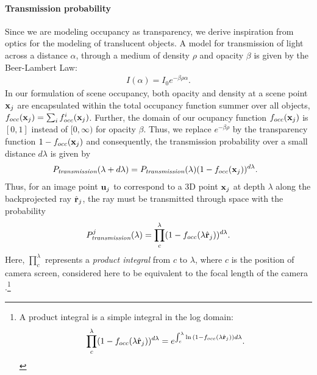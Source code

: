 \paragraph{Transmission probability}
\label{sec:ptransmission}
Since we are modeling occupancy as transparency, we derive inspiration from optics for the modeling of translucent objects. A model for transmission of light across a distance $\alpha$, through a medium of density $\rho$ and opacity $\beta$ is given by the Beer-Lambert Law:
\begin{align}
I(\alpha) = I_0 e^{-\beta\rho\alpha}.
\end{align}
%
In our formulation of scene occupancy, both opacity and density at a scene point $\mathbf{x}_j$ are encapsulated within the total occupancy function summer over all objects, $f_{occ}(\mathbf{x}_j) = \sum_i f^i_{occ}(\mathbf{x}_j)$. Further, the domain of our ocupancy function $f_{occ}(\mathbf{x}_j)$ is $[0, 1]$ instead of $[0, \infty)$ for opacity $\beta$. Thus, we replace $e^{-\beta\rho}$ by the transparency function $1 - f_{occ}(\mathbf{x}_j)$ and consequently, the transmission probability over a small distance $d\lambda$ is given by
%
\begin{align}
  \!\!\!\! P_{\textit{transmission}}(\lambda + d\lambda) = P_{\textit{transmission}}(\lambda) (1-f_{occ}(\mathbf{x}_j))^{d\lambda}.
\end{align}
%
Thus, for an image point $\mathbf{u}_j$ to correspond to a 3D point $\mathbf{x}_j$ at depth $\lambda$ along the backprojected ray $\hat{\mathbf{r}}_j$, the ray must be transmitted through space with the probability
\begin{align}
P^j_{\textit{transmission}}(\lambda) = \prod_{c}^{\lambda} (1 - f_{occ}(\lambda \hat{\mathbf{r}}_j))^{d\lambda}.
\label{eq:ptrans-integral}
\end{align}
Here, $\prod_{c}^{\lambda}$ represents a \emph{product integral} from $c$ to $\lambda$, where $c$ is the position of camera screen, considered here to be equivalent to the focal length of the camera .\footnote{A product integral is a simple integral in the log domain: 
\vspace{-0.2cm}
\begin{equation}
\prod_{c}^{\lambda} (1 - f_{occ}(\lambda \hat{\mathbf{r}}_j))^{d\lambda} = e^{\int_{c}^{\lambda} \ln{(1 - f_{occ}(\lambda \hat{\mathbf{r}}_j))}{d\lambda}}. \nonumber
\end{equation}
}

